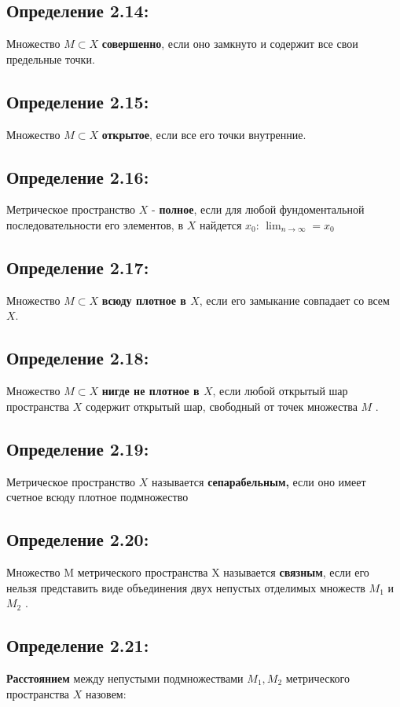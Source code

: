 \documentclass[12pt]{article}
\begin{document}
\subsection*{Определение 2.14:}
	 Множество $M \subset X$\textbf{ совершенно}, если оно замкнуто и содержит все свои предельные точки.
	 
\subsection*{Определение 2.15:}
	 Множество $M \subset X$ \textbf{открытое}, если все его точки внутренние.
	 
\subsection*{Определение 2.16:}
	 Метрическое пространство $X$ - \textbf{полное}, если для любой фундоментальной последовательности его элементов, 
	 в $X$ найдется $x_0$: $\lim_{n \to \infty} = x_0$

\subsection*{Определение 2.17:}
 Множество $M \subset X$ \textbf{всюду плотное в $X$}, если его замыкание совпадает со всем $X$.
 
\subsection*{Определение 2.18:}
 Множество $M \subset X$ \textbf{нигде не  плотное в $X$}, если любой открытый шар пространства $X$
содержит открытый шар, свободный от точек множества $M$ .
	 	
\subsection*{Определение 2.19:}	 	
	 Метрическое пространство $X$ называется \textbf{сепарабельным,}
		если оно имеет счетное всюду плотное подмножество

\subsection*{Определение 2.20:}	 		
	Множество M метрического пространства X называется \textbf{связным}, если его нельзя представить виде объединения двух непустых отделимых множеств $M_1$ и $M_2$ .
		
\subsection*{Определение 2.21:}
	\textbf{Расстоянием} между непустыми подмножествами $M_1, M_2$ метрического пространства $X$ назовем:
	
\end{document}
